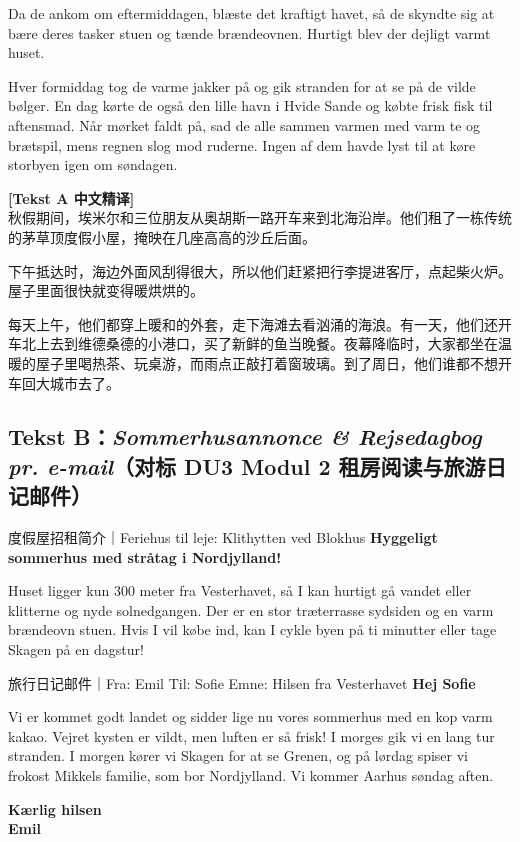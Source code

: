 Da de ankom om eftermiddagen, blæste det kraftigt  havet, så de skyndte sig at bære deres tasker  stuen og tænde  brændeovnen. Hurtigt blev der dejligt varmt  huset.

Hver formiddag tog de varme jakker på og gik  stranden for at se på de vilde bølger. En dag kørte de også  den lille havn i Hvide Sande og købte frisk fisk til aftensmad. Når mørket faldt på, sad de alle sammen  varmen med varm te og brætspil, mens regnen slog mod ruderne. Ingen af dem havde lyst til at køre  storbyen igen om søndagen.

\begin{transbox}
\small
\textbf{\color{NCDTeal}[Tekst A 中文精译]}\\
秋假期间，埃米尔和三位朋友从奥胡斯一路开车来到北海沿岸。他们租了一栋传统的茅草顶度假小屋，掩映在几座高高的沙丘后面。

下午抵达时，海边外面风刮得很大，所以他们赶紧把行李提进客厅，点起柴火炉。屋子里面很快就变得暖烘烘的。

每天上午，他们都穿上暖和的外套，走下海滩去看汹涌的海浪。有一天，他们还开车北上去到维德桑德的小港口，买了新鲜的鱼当晚餐。夜幕降临时，大家都坐在温暖的屋子里喝热茶、玩桌游，而雨点正敲打着窗玻璃。到了周日，他们谁都不想开车回大城市去了。
\end{transbox}

\subsection*{Tekst B：\textit{Sommerhusannonce \& Rejsedagbog pr. e-mail}（对标 DU3 Modul 2 租房阅读与旅游日记邮件）}

\begin{emailbox}{度假屋招租简介｜Feriehus til leje: Klithytten ved Blokhus}
\textbf{Hyggeligt sommerhus med stråtag i Nordjylland!}

Huset ligger kun 300 meter fra Vesterhavet, så I kan hurtigt gå  vandet eller  klitterne og nyde solnedgangen. Der er en stor træterrasse  sydsiden og en varm brændeovn  stuen. Hvis I vil købe ind, kan I cykle  byen på ti minutter eller tage  Skagen på en dagstur!
\end{emailbox}

\begin{emailbox}{旅行日记邮件｜Fra: Emil \quad Til: Sofie \quad Emne: Hilsen fra Vesterhavet}
\textbf{Hej Sofie}

Vi er kommet godt  landet og sidder lige nu  vores sommerhus med en kop varm kakao. Vejret  kysten er vildt, men luften er så frisk! I morges gik vi en lang tur  stranden. I morgen kører vi  Skagen for at se Grenen, og på lørdag spiser vi frokost  Mikkels familie, som bor  Nordjylland. Vi kommer  Aarhus søndag aften.

\textbf{Kærlig hilsen}\\
\textbf{Emil}
\end{emailbox}

